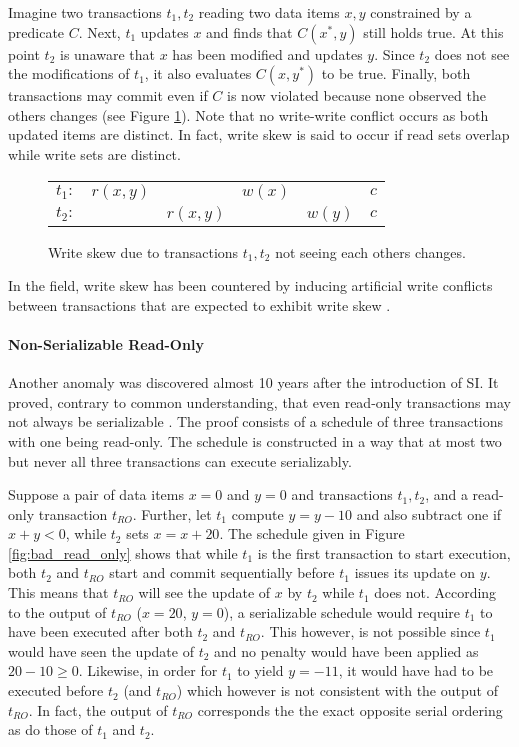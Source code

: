 Imagine two transactions $t_1, t_2$ reading two data items $x, y$ constrained by
a predicate $C$. Next, $t_1$ updates $x$ and finds that $C(x^{*}, y)$ still
holds true. At this point $t_2$ is unaware that $x$ has been modified and
updates $y$. Since $t_2$ does not see the modifications of $t_1$, it also
evaluates $C(x, y^{*})$ to be true. Finally, both transactions may commit even
if $C$ is now violated because none observed the others changes (see Figure
\ref{fig:write_skew}). Note that no write-write conflict occurs as both updated
items are distinct. In fact, write skew is said to occur if read sets overlap
while write sets are distinct.

\begin{figure}[!h]
    \centering
    \begin{tabular}{r c c c c c}
        $t_1:$ & $r(x,y)$ &          & $w(x)$ &        & $c$ \\
        $t_2:$ &          & $r(x,y)$ &        & $w(y)$ & $c$ \\
    \end{tabular}
    \caption{Write skew due to transactions $t_1, t_2$ not seeing each others changes.}
    \label{fig:write_skew}
\end{figure}

In the field, write skew has been countered by inducing artificial write
conflicts between transactions that are expected to exhibit write skew
\cite{fekete2005making}.

\paragraph{Non-Serializable Read-Only}

Another anomaly was discovered almost 10 years after the introduction of SI. It
proved, contrary to common understanding, that even read-only transactions may
not always be serializable \cite{fekete2004read}. The proof consists of a
schedule of three transactions with one being read-only. The schedule is
constructed in a way that at most two but never all three transactions can
execute serializably.

Suppose a pair of data items $x = 0$ and $y = 0$ and transactions $t_1, t_2$,
and a read-only transaction $t_{RO}$. Further, let $t_1$ compute $y = y - 10$
and also subtract one if $x + y < 0$, while $t_2$ sets $x = x + 20$. The
schedule given in Figure \ref{fig:bad_read_only} shows that while $t_1$ is the
first transaction to start execution, both $t_2$ and $t_{RO}$ start and commit
sequentially before $t_1$ issues its update on $y$. This means that $t_{RO}$
will see the update of $x$ by $t_2$ while $t_1$ does not. According to the
output of $t_{RO}$ ($x = 20$, $y = 0$), a serializable schedule would require
$t_1$ to have been executed after both $t_2$ and $t_{RO}$. This however, is not
possible since $t_1$ would have seen the update of $t_2$ and no penalty would
have been applied as $20 - 10 \geq 0$. Likewise, in order for $t_1$ to yield $y =
-11$, it would have had to be executed before $t_2$ (and $t_{RO}$) which however
is not consistent with the output of $t_{RO}$. In fact, the output of $t_{RO}$
corresponds the the exact opposite serial ordering as do those of $t_1$ and
$t_2$.

